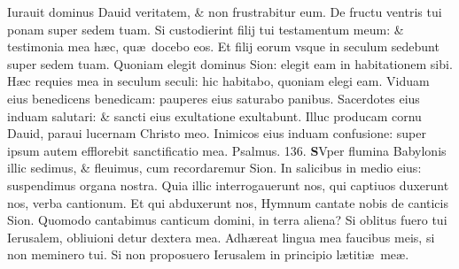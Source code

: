 \documentclass[a5paper,10pt]{book}
\def\ae{æ}
\begin{document}
\begin{multicols*}{2}
\newline \color{red} I\color{black}urauit dominus Dauid veritatem, \& non frustrabitur eum.
\newline \color{red} D\color{black}e fructu ventris tui ponam super sedem tuam.
\newline \color{red} S\color{black}i custodierint filij tui testamentum meum: \& testimonia mea h\ae c, qu\ae \ docebo eos.
\newline \color{red} E\color{black}t filij eorum vsque in seculum sedebunt super sedem tuam.
\newline \color{red} Q\color{black}uoniam elegit dominus Sion: elegit eam in habitationem sibi.
\newline \color{red} H\color{black}\ae c requies mea in seculum seculi: hic habitabo, quoniam elegi eam.
\newline \color{red} V\color{black}iduam eius benedicens benedicam: pauperes eius saturabo panibus.
\newline \color{red} S\color{black}acerdotes eius induam salutari: \& sancti eius exultatione exultabunt.
\newline \color{red} I\color{black}lluc producam cornu Dauid, paraui lucernam Christo meo.
\newline \color{red} I\color{black}nimicos eius induam confusione: super ipsum autem efflorebit sanctificatio mea. \quad \color{red} Psalmus. \hypertarget{ps136}{136.} \color{black}
\lettrine[lines=2]{\bfseries \color{red} S}{}Vper flumina Babylonis illic sedimus, \& fleuimus, cum recordaremur Sion.
\newline \color{red} I\color{black}n salicibus in medio eius: suspendimus organa nostra.
\newline \color{red} Q\color{black}uia illic interrogauerunt nos, qui captiuos duxerunt nos, verba cantionum.
\newline \color{red} E\color{black}t qui abduxerunt nos, Hymnum cantate nobis de canticis Sion.
\newline \color{red} Q\color{black}uomodo cantabimus canticum domini, in terra aliena?
\newline \color{red} S\color{black}i oblitus fuero tui Ierusalem, obliuioni detur dextera mea.
\newline \color{red} A\color{black}dh\ae reat lingua mea faucibus meis, si non meminero tui.
\newline \color{red} S\color{black}i non proposuero Ierusalem in principio l\ae titi\ae \ me\ae .

\end{multicols*}
\end{document}

